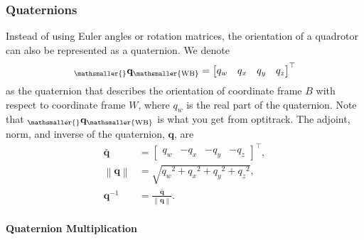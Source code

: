 \documentclass[10pt,a4paper,fleqn]{article}
\newcommand{\qx}[0]{\ensuremath{q_x}}
\newcommand{\qy}[0]{\ensuremath{q_y}}
\newcommand{\qz}[0]{\ensuremath{q_z}}
\newcommand{\qw}[0]{\ensuremath{q_w}}
\newcommand{\bVec}[1]{\mathbf{#1}}
\newcommand{\norm}[1]{\left\lVert#1\right\rVert}
\newcommand{\vect}[3]{{_{\mathsmaller{\mathrm{#2}}}\mathbf{#1}_{\mathsmaller{\mathrm{#3}}}}} %
\newcommand{\wfr}[0]{\ensuremath{W}} %
\newcommand{\bfr}[0]{\ensuremath{B}} %
\begin{document}
\subsubsection{Quaternions}\label{sec:trafoquaternion}

Instead of using Euler angles or rotation matrices, the orientation of a quadrotor can also be represented as a quaternion. 
We denote
%
\begin{equation}
\vect{q}{}{\wfr \bfr} = \begin{bmatrix} \qw & \qx & \qy & \qz \end{bmatrix}^{\top} \label{eq:quat_convention}
\end{equation}
%
as the quaternion that describes the orientation of coordinate frame $\bfr$ with respect to coordinate frame $\wfr$, where $q_w$ is the real part of the quaternion. 
Note that $\vect{q}{}{\wfr \bfr}$ is what you get from optitrack. 
The adjoint, norm, and inverse of the quaternion, $\bVec{q}$, are 
% 
\begin{align}
	\bar{\bVec{q}} &= \begin{bmatrix} \qw & -\qx & -\qy & -\qz \end{bmatrix}^{\top},\\
	 \norm{\bVec{q}} & =  \sqrt{ \qw^2 + \qx^2 + \qy^2 + \qz^2 },\\
	 \bVec{q}^{-1} & = \frac{ \bar{\bVec{q}} }{ \norm{\bVec{q}}  }.
\end{align}
%
\paragraph{Quaternion Multiplication}
\end{document}
